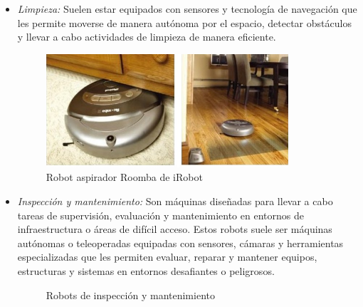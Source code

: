 \begin{itemize}
 \item \textit{Limpieza:} Suelen estar equipados con sensores y tecnología de navegación que les permite moverse de manera autónoma por el espacio, detectar obstáculos y llevar a cabo actividades de limpieza de manera eficiente. 
 
 \begin{figure} [H]
  \begin{center}
    \includegraphics[width=90mm]{figs/roomba}
  \end{center}
  \caption{Robot aspirador Roomba de iRobot}
  \label{fig:roomba}
 \end{figure}
 
 \item \textit{Inspección y mantenimiento:} Son máquinas diseñadas para llevar a cabo tareas de supervisión, evaluación y mantenimiento en entornos de infraestructura o áreas de difícil acceso. Estos robots suele ser máquinas autónomas o teleoperadas equipadas con sensores, cámaras y herramientas especializadas que les permiten evaluar, reparar y mantener equipos, estructuras y sistemas en entornos desafiantes o peligrosos. 
 
 \begin{figure}[H]
    \begin{center}
      \subcapcentertrue
      \hspace{2mm}
    \end{center}
    \caption{Robots de inspección y mantenimiento}
    \label{fig:Robots de inspección y mantenimiento}
  \end{figure}
 

\end{itemize}
